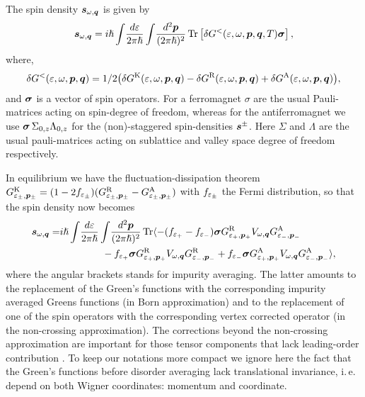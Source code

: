 The spin density $\boldsymbol{s}_{\omega,\boldsymbol{q}}$ is given by
\begin{equation}
    \boldsymbol{s}_{\omega,\boldsymbol{q}} = {i\hslash} \int\!\frac{d\varepsilon}{2\pi\hslash}\int\!\frac{d^2\boldsymbol{p}}{(2\pi\hslash)^2}\operatorname{Tr} \left[\delta G^<({\varepsilon,\omega,\boldsymbol{p},\boldsymbol{q}},T) \boldsymbol{\sigma}\right],
\end{equation}
where,
\begin{multline}
    \delta G^<(\varepsilon,\omega,\boldsymbol{p},\boldsymbol{q}) = 1/2 \big(\delta G^\text{K}(\varepsilon,\omega,\boldsymbol{p},\boldsymbol{q})-
    \delta G^\text{R}(\varepsilon,\omega,\boldsymbol{p},\boldsymbol{q})+\delta G^\text{A}(\varepsilon,\omega,\boldsymbol{p},\boldsymbol{q})\big),  
\end{multline}
and $\boldsymbol{\sigma}$ is a vector of spin operators. For a ferromagnet $\sigma$ are the usual Pauli-matrices acting on spin-degree of freedom, whereas for the antiferromagnet we use $\boldsymbol{\sigma}\,\Sigma_{0,z}\Lambda_{0,z}$ for the (non)-staggered spin-densities $\boldsymbol{s}^\pm$. Here $\Sigma$ and $\Lambda$ are the usual pauli-matrices acting on sublattice and valley space degree of freedom respectively.

In equilibrium we have the fluctuation-dissipation theorem $G^\text{K}_{\varepsilon_\pm,\boldsymbol{p}_\pm} = (1-2f_{\varepsilon_\pm})(G^\text{R}_{\varepsilon_\pm,\boldsymbol{p}_\pm}-G^\text{A}_{\varepsilon_\pm,\boldsymbol{p}_\pm}) $ with $f_{\varepsilon_\pm}$ the Fermi distribution, so that the spin density now becomes
\begin{align}
    \boldsymbol{s}_{\omega,\boldsymbol{q}} =& {i\hslash} \int\!\frac{d\varepsilon}{2\pi\hslash}\int\!\frac{d^2\boldsymbol{p}}{(2\pi\hslash)^2}\operatorname{Tr}\langle
     -(f_{\varepsilon_+}-f_{\varepsilon_-})\boldsymbol{\sigma}G^\text{R}_{\varepsilon_+,\boldsymbol{p}_+} V_{\omega,\boldsymbol{q}}G^\text{A}_{\varepsilon_-,\boldsymbol{p}_-}\nonumber\\
    &\hspace{1.5cm}-f_{\varepsilon_+}\boldsymbol{\sigma}G^\text{R}_{\varepsilon_+,\boldsymbol{p}_+} V_{\omega,\boldsymbol{q}}G^\text{R}_{\varepsilon_-,\boldsymbol{p}_-}
    +f_{\varepsilon_-}\boldsymbol{\sigma}G^\text{A}_{\varepsilon_+,\boldsymbol{p}_+} V_{\omega,\boldsymbol{q}}G^\text{A}_{\varepsilon_-,\boldsymbol{p}_-}\rangle,
\end{align}
where the angular brackets stands for impurity averaging. The latter amounts to the replacement of the Green's functions with the corresponding impurity averaged Greens functions (in Born approximation) and to the replacement of one of the spin operators with the corresponding vertex corrected operator (in the non-crossing approximation). The corrections beyond the non-crossing approximation are important for those tensor components that lack leading-order contribution \cite{ivan}. To keep our notations more compact we ignore here the fact that the Green's functions before disorder averaging lack translational invariance, i.\,e. depend on both Wigner coordinates: momentum and coordinate. 

